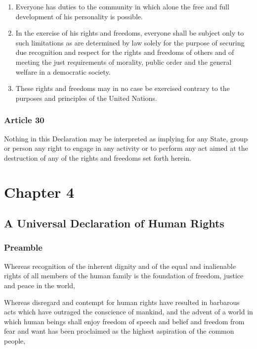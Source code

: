 \documentclass[
  ngerman,
  american,
  titlepage,
  openright,
  DIV=calc,
  toc=listof,
  listof=nochaptergap]{scrbook}
\begin{document}
\begin{enumerate}
\def\labelenumi{\arabic{enumi}.}
\item
  Everyone has duties to the community in which alone the free and full
  development of his personality is possible.
\item
  In the exercise of his rights and freedoms, everyone shall be subject
  only to such limitations as are determined by law solely for the
  purpose of securing due recognition and respect for the rights and
  freedoms of others and of meeting the just requirements of morality,
  public order and the general welfare in a democratic society.
\item
  These rights and freedoms may in no case be exercised contrary to the
  purposes and principles of the United Nations.
\end{enumerate}

\subsection{Article 30}\label{article-30-2}

Nothing in this Declaration may be interpreted as implying for any
State, group or person any right to engage in any activity or to perform
any act aimed at the destruction of any of the rights and freedoms set
forth herein.

\chapter{Chapter 4}\label{sec-chapter4}

\section{A Universal Declaration of Human
Rights}\label{a-universal-declaration-of-human-rights-3}

\subsection{Preamble}\label{preamble-3}

Whereas recognition of the inherent dignity and of the equal and
inalienable rights of all members of the human family is the foundation
of freedom, justice and peace in the world,

Whereas disregard and contempt for human rights have resulted in
barbarous acts which have outraged the conscience of mankind, and the
advent of a world in which human beings shall enjoy freedom of speech
and belief and freedom from fear and want has been proclaimed as the
highest aspiration of the common people,
\end{document}
